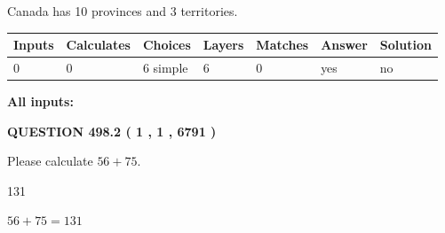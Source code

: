 \documentclass[12pt]{article}
\begin{document}
 
Canada has 10  provinces and 3 territories.
 
 
\noindent{}
 
 
   
   
   
   
\noindent\begin{tabular}{|l|l|l|l|l|l|l|}
 \hline
Inputs & Calculates & Choices & Layers & Matches & Answer & Solution \\ \hline
 0  & 
 0  & 
 6
  simple  
  & 
 6  & 
 0  & 
  yes & 
  no 
  \\ \hline
 \end{tabular}
   
   
   
   
\noindent{}
   
   
   
   
\noindent\vspace{0.1in}\hspace{-0.08in} {\textbf{\Large{All inputs: }}}
   
   
  
\vspace{0.2in}
  
{\textbf{\Large{QUESTION
498.2 
 ( 1 , 1 , 6791 )
}}}
  
  
 
Please calculate $ %
56 +  %
75 $.
 
 
 
\noindent{}
 
 

131
 
 
\noindent{}
 
 

 
 
 
\noindent{}
 
 

$ %
56 +  %
75=   %
131$
 
 
\noindent{}
 
 

 
   
\end{document}
